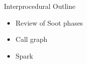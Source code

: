 \begin{slide}{Interprocedural Outline}
\begin{itemize}
\item Review of Soot phases
\item Call graph
\item Spark
\end{itemize}
\end{slide}



